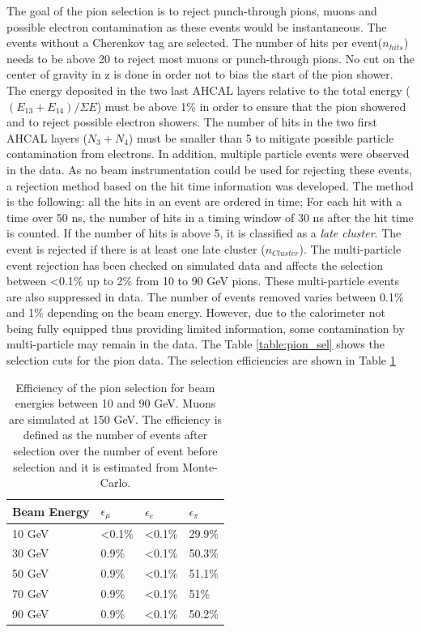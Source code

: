\documentclass{JINST}
\begin{document}
The goal of the pion selection is to reject punch-through pions, muons and possible electron contamination as these events would be instantaneous. The events without a Cherenkov tag are selected. The number of hits per event($n_{hits}$) needs to be above 20 to reject most muons or punch-through pions. No cut on the center of gravity in z is done in order not to bias the start of the pion shower. The energy deposited in the two last AHCAL layers relative to the total energy ($(E_{13}+E_{14})/\Sigma E$) must be above 1\% in order to ensure that the pion showered and to reject possible electron showers. The number of hits in the two first AHCAL layers ($N_3+N_4$) must be smaller than 5 to mitigate possible particle contamination from electrons. In addition, multiple particle events were observed in the data. As no beam instrumentation could be used for rejecting these events, a rejection method based on the hit time information was developed. The method is the following: all the hits in an event are ordered in time; For each hit with a time over 50 ns, the number of hits in a timing window of 30 ns after the hit time is counted. If the number of hits is above 5, it is classified as a \textit{late cluster}. The event is rejected if there is at least one late cluster ($n_{Cluster}$). The multi-particle event rejection has been checked on simulated data and affects the selection between <0.1\% up to 2\% from 10 to 90 GeV pions. These multi-particle events are also suppressed in data. The number of events removed varies between 0.1\% and 1\% depending on the beam energy. However, due to the calorimeter not being fully equipped thus providing limited information, some contamination by multi-particle may remain in the data. The Table \ref{table:pion_sel} shows the selection cuts for the pion data. The selection efficiencies are shown in Table \ref{table:eff_pion}

\begin{table}[htb!]
	\centering
	\caption{Efficiency of the pion selection for beam energies between 10 and 90 GeV. Muons are simulated at 150 GeV. The efficiency is defined as the number of events after selection over the number of event before selection and it is estimated from Monte-Carlo.}
	\label{table:eff_pion}
	\begin{tabular}{@{} llll @{}}
		\toprule
		\textbf{Beam Energy} & \textbf{$\epsilon_{\mu}$} & \textbf{$\epsilon_{e}$} & \textbf{$\epsilon_{\pi}$}\\
		\midrule
		10 GeV & <0.1\% & <0.1\% & 29.9\%\\
		30 GeV & 0.9\% & <0.1\% & 50.3\%\\
		50 GeV & 0.9\% & <0.1\% & 51.1\%\\
		70 GeV & 0.9\% & <0.1\% & 51\%\\
		90 GeV & 0.9\% & <0.1\% & 50.2\%\\
		\bottomrule
	\end{tabular}
\end{table}
\end{document}
